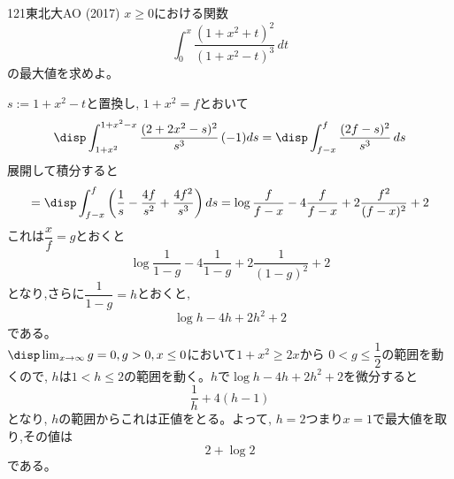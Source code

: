 \begin{prob}{121}{}{東北大AO (2017)}
 $x \geq 0$における関数
 \[ \int_0^x\! \frac{(1+x^2+t)^2}{(1+x^2-t)^3} \,dt \]
 の最大値を求めよ。
\end{prob}
$s:=1+x^2-t$と置換し, $1+x^2=f$とおいて
\[\disp\int_{1+x^2}^{1+x^2-x} \dfrac{(2+2x^2-s)^2}{s^3} \,(-1)ds=\disp\int_{f-x}^{f} \dfrac{(2f-s)^2}{s^3} \,ds \]
展開して積分すると
\[=\disp\int_{f-x}^{f}\left(\dfrac{1}{s} -\dfrac{4f}{s^2}+\dfrac{4f^2}{s^3}\right)ds=\log{\dfrac{f}{f-x}}-4\dfrac{f}{f-x} +2\dfrac{f^2}{(f-x)^2}+2\]
これは$\dfrac{x}{f}=g$とおくと
\[\log{\dfrac{1}{1-g}}-4\dfrac{1}{1-g}+2\dfrac{1}{(1-g)^2}+2\]
となり,さらに$\dfrac{1}{1-g}=h$とおくと,
\[\log{h}-4h+2h^2+2\]
である。\\
$\disp\lim_{x\to\infty}g=0, g>0, x\leq 0$において$1+x^2\geq 2x$から $0<g\leq\dfrac{1}{2}$の範囲を動くので, $h$は$1<h\leq 2$の範囲を動く。$h$で$\log{h}-4h+2h^2+2$を微分すると
\[\dfrac{1}{h}+4(h-1)\]
となり, $h$の範囲からこれは正値をとる。よって, $h=2$つまり$x=1$で最大値を取り,その値は
\[2+\log{2}\]
である。
